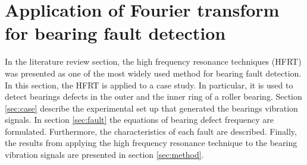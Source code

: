 \documentclass[../Main/thesis.tex]{subfiles}
\begin{document}
\section{Application of Fourier transform for bearing fault detection}
In the literature review section, the high frequency resonance techniques (HFRT) was presented as one of the most widely used method for bearing fault detection. In this section, the HFRT is applied to a case study. In particular, it is used to detect bearings defects in the outer and the inner ring of a roller bearing.
\justify
Section \ref{sec:case} describe the experimental set up that generated the bearings vibration signals. In section \ref{sec:fault} the equations of bearing defect frequency are formulated. Furthermore, the characteristics of each fault are described.
Finally, the results from applying the high frequency resonance technique to the bearing vibration signals are presented in section \ref{sec:method}.


\end{document}

